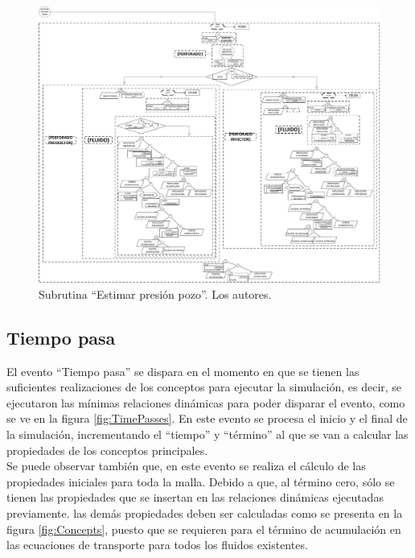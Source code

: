 \begin{figure}[h]
	\centering%
	\includegraphics[width=1\linewidth]{Fig/EstimarPwf.pdf}%
	\caption[Subrutina ``Estimar presión pozo''.]{Subrutina ``Estimar presión pozo''. Los autores.}
	\label{fig:CalculateFlow}
\end{figure}

\subsection{Tiempo pasa}\label{sec:PS_TimePasses}
El evento ``Tiempo pasa'' se dispara en el momento en que se tienen las suficientes realizaciones de los conceptos para ejecutar la simulación, es decir, se ejecutaron las mínimas relaciones dinámicas para poder disparar el evento, como se ve en la figura \ref{fig:TimePasses}. En este evento se procesa el inicio y el final de la simulación, incrementando el ``tiempo'' y ``término'' al que se van a calcular las propiedades de los conceptos principales.\\

Se puede observar también que, en este evento se realiza el cálculo de las propiedades iniciales para toda la malla. Debido a que, al término cero, sólo se tienen las propiedades que se insertan en las relaciones dinámicas ejecutadas previamente. las demás propiedades deben ser calculadas como se presenta en la figura \ref{fig:Concepts}, puesto que se requieren para el término de acumulación en las ecuaciones de transporte para todos los fluidos existentes.

